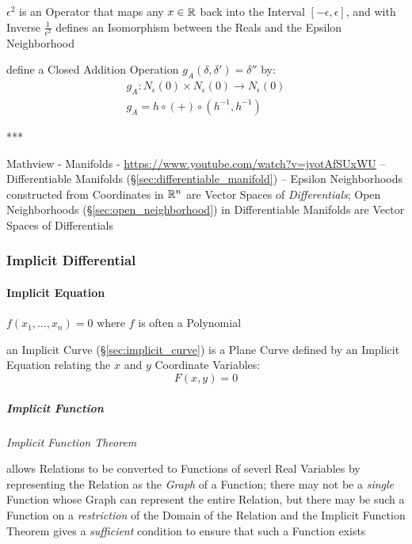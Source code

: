 $\epsilon^2$ is an Operator that maps any $x \in \mathbb{R}$ back into the Interval
$[-\epsilon, \epsilon]$, and with Inverse $\frac{1}{\epsilon^2}$ defines an
Isomorphism between the Reals and the Epsilon Neighborhood

define a Closed Addition Operation $g_A(\delta, \delta') = \delta''$ by:
\begin{align*}
  g_A : N_\epsilon(0) \times N_\epsilon(0) \rightarrow N_\epsilon(0) \\
  g_A = h \circ (+) \circ (h^{-1}, h^{-1})
\end{align*}

***

Mathview - Manifolds - \url{https://www.youtube.com/watch?v=jvotAfSUxWU}
--
Differentiable Manifolds (\S\ref{sec:differentiable_manifold}) -- Epsilon
Neighborhoods constructed from Coordinates in $\mathbb{R}^n$ are Vector Spaces of
\emph{Differentials}; Open Neighborhoods (\S\ref{sec:open_neighborhood}) in
Differentiable Manifolds are Vector Spaces of Differentials



\subsubsection{Implicit Differential}\label{sec:implicit_differential}

\paragraph{Implicit Equation}\label{sec:implicit_equation}\hfill


$f(x_1, \ldots, x_n) = 0$ where $f$ is often a Polynomial

\fist an Implicit Curve (\S\ref{sec:implicit_curve}) is a Plane Curve defined by
an Implicit Equation relating the $x$ and $y$ Coordinate Variables:
\[
  F(x,y) = 0
\]



\subparagraph{Implicit Function}\label{sec:implicit_function}\hfill

\emph{Implicit Function Theorem}

allows Relations to be converted to Functions of severl Real Variables by
representing the Relation as the \emph{Graph} of a Function; there may not be a
\emph{single} Function whose Graph can represent the entire Relation, but there
may be such a Function on a \emph{restriction} of the Domain of the Relation and
the Implicit Function Theorem gives a \emph{sufficient} condition to ensure that
such a Function exists



